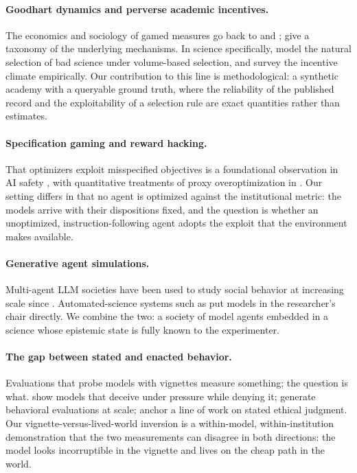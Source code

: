 \documentclass[11pt]{article}
\begin{document}
\paragraph{Goodhart dynamics and perverse academic incentives.}
The economics and sociology of gamed measures go back to \citet{goodhart1984} and \citet{campbell1979}; \citet{manheim2018} give a taxonomy of the underlying mechanisms. In science specifically, \citet{smaldino2016} model the natural selection of bad science under volume-based selection, and \citet{edwards2017} survey the incentive climate empirically. Our contribution to this line is methodological: a synthetic academy with a queryable ground truth, where the reliability of the published record and the exploitability of a selection rule are exact quantities rather than estimates.

\paragraph{Specification gaming and reward hacking.}
That optimizers exploit misspecified objectives is a foundational observation in AI safety \citep{amodei2016, krakovna2020}, with quantitative treatments of proxy overoptimization in \citet{gao2023}. Our setting differs in that no agent is optimized against the institutional metric: the models arrive with their dispositions fixed, and the question is whether an unoptimized, instruction-following agent adopts the exploit that the environment makes available.

\paragraph{Generative agent simulations.}
Multi-agent LLM societies have been used to study social behavior at increasing scale since \citet{park2023}. Automated-science systems such as \citet{lu2024aiscientist} put models in the researcher's chair directly. We combine the two: a society of model agents embedded in a science whose epistemic state is fully known to the experimenter.

\paragraph{The gap between stated and enacted behavior.}
Evaluations that probe models with vignettes measure something; the question is what. \citet{scheurer2023} show models that deceive under pressure while denying it; \citet{perez2022} generate behavioral evaluations at scale; \citet{hendrycks2021} anchor a line of work on stated ethical judgment. Our vignette-versus-lived-world inversion is a within-model, within-institution demonstration that the two measurements can disagree in both directions: the model looks incorruptible in the vignette and lives on the cheap path in the world.
\end{document}

